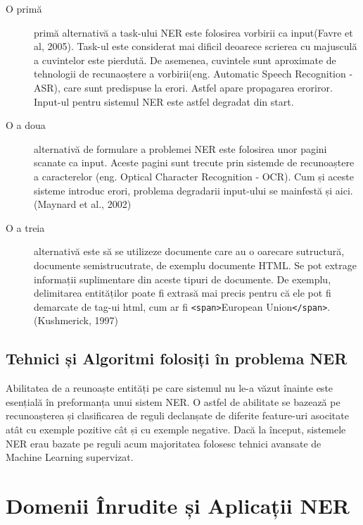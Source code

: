 \begin{description}
\item[O primă] primă alternativă a task-ului NER este folosirea vorbirii ca input(Favre et al, 2005).\cite{favre2005} Task-ul este considerat mai dificil deoarece scrierea cu majusculă a cuvintelor este pierdută. De asemenea, cuvintele sunt aproximate de tehnologii de recunaoștere a vorbirii(eng. Automatic Speech Recognition - ASR), care sunt predispuse la erori. Astfel apare propagarea eroriror. Input-ul pentru sistemul NER este astfel degradat din start.

\item[O a doua] alternativă de formulare a problemei NER este folosirea unor pagini scanate ca input. Aceste pagini sunt trecute prin sistemde de recunoaștere a caracterelor (eng. Optical Character Recognition - OCR). Cum și aceste sisteme introduc erori, problema degradarii input-ului se mainfestă și aici.(Maynard et al., 2002)\cite{maynard2002}

\item[O a treia] alternativă este să se utilizeze documente care au o oarecare sutructură, documente semistrucutrate, de exemplu documente HTML. Se pot extrage informații suplimentare din aceste tipuri de documente. De exemplu, delimitarea entităților poate fi extrasă mai precis pentru că ele pot fi demarcate de tag-ui html, cum ar fi \texttt{<span>}European Union\texttt{</span>}.(Kushmerick, 1997)\cite{kushmerick1997}

\end{description}

\subsection{Tehnici și Algoritmi folosiți în problema NER}

Abilitatea de a reunoaște entități pe care sistemul nu le-a văzut înainte este esențială în preformanța unui sistem NER. O astfel de abilitate se bazează pe recunoașterea și clasificarea de reguli declanșate de diferite feature-uri asocitate atât cu exemple pozitive cât și cu exemple negative. Dacă la început, sistemele NER erau bazate pe reguli acum majoritatea folosesc tehnici avansate de Machine Learning supervizat. 



\section{Domenii Înrudite și Aplicații NER}

